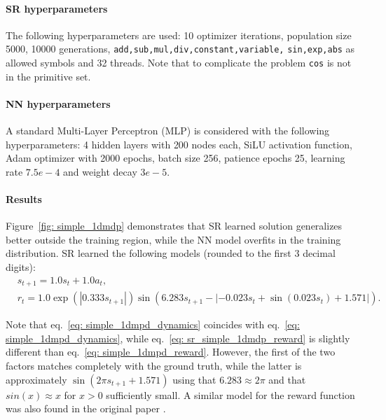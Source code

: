 \documentclass[11pt]{article}
\begin{document}
\paragraph{SR hyperparameters} The following hyperparameters are used: 10 optimizer iterations, population size 5000, 10000 generations, \texttt{add,sub,mul,div,constant,variable,} \texttt{sin,exp,abs} as allowed symbols and 32 threads. Note that to complicate the problem \texttt{cos} is not in the primitive set.

\paragraph{NN hyperparameters} A standard Multi-Layer Perceptron (MLP) is considered with the following hyperparameters: 4 hidden layers with 200 nodes each, SiLU activation function, Adam optimizer with 2000 epochs, batch size 256, patience epochs 25, learning rate $7.5e-4$ and weight decay $3e-5$.

\paragraph{Results} Figure~\ref{fig: simple_1dmdp} demonstrates that SR learned solution generalizes better outside the training region, while the NN model overfits in the training distribution. SR learned the following models (rounded to the first $3$ decimal digits):
\begin{align}
	&s_{t+1} = 1.0s_t + 1.0a_t, \label{eq: sr_simple_1dmdp_dynamics}\\
	&r_t = 1.0\exp(|0.333s_{t+1}|)\sin(6.283s_{t+1} - |-0.023 s_t + \sin(0.023 s_t) + 1.571|).\label{eq: sr_simple_1dmdp_reward}
\end{align}

Note that eq.~\eqref{eq: simple_1dmpd_dynamics} coincides with eq.~\eqref{eq: simple_1dmpd_dynamics}, while eq.~\eqref{eq: sr_simple_1dmdp_reward} is slightly different than eq.~\eqref{eq: simple_1dmpd_reward}. However, the first of the two factors matches completely with the ground truth, while the latter is approximately $\sin(2\pi s_{t+1} + 1.571)$ using that $6.283\approx 2\pi$ and that $sin(x) \approx x$ for $x>0$ sufficiently small. A similar model for the reward function was also found in the original paper \cite{kamienny2022symbolic}.
\end{document}
